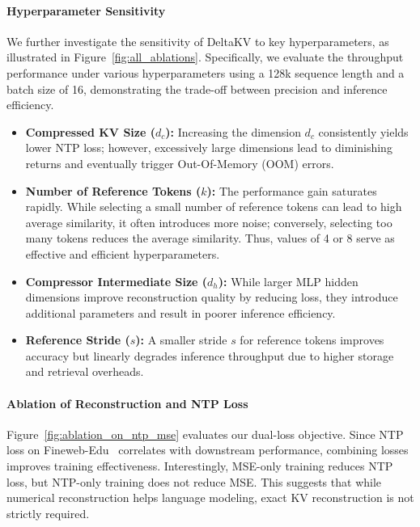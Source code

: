 \paragraph{Hyperparameter Sensitivity}
We further investigate the sensitivity of DeltaKV to key hyperparameters, as illustrated in Figure~\ref{fig:all_ablations}. 
Specifically, we evaluate the throughput performance under various hyperparameters using a 128k sequence length and a batch size of 16, demonstrating the trade-off between precision and inference efficiency.
\vspace{-0.5em}
\begin{itemize}[nolistsep, left=0pt]
  \item \textbf{Compressed KV Size ($d_c$):} Increasing the dimension $d_c$ consistently yields lower NTP loss; however, excessively large dimensions lead to diminishing returns and eventually trigger Out-Of-Memory (OOM) errors. 
  
  \item \textbf{Number of Reference Tokens ($k$):} The performance gain saturates rapidly. While selecting a small number of reference tokens can lead to high average similarity, it often introduces more noise; conversely, selecting too many tokens reduces the average similarity. Thus, values of 4 or 8 serve as effective and efficient hyperparameters.

  \item \textbf{Compressor Intermediate Size ($d_h$):} While larger MLP hidden dimensions improve reconstruction quality by reducing loss, they introduce additional parameters and result in poorer inference efficiency.  

  \item \textbf{Reference Stride ($s$):} A smaller stride $s$ for reference tokens improves accuracy but linearly degrades inference throughput due to higher storage and retrieval overheads.
\end{itemize}

\vspace{-0.5em}
\paragraph{Ablation of Reconstruction and NTP Loss}
Figure~\ref{fig:ablation_on_ntp_mse} evaluates our dual-loss objective.
Since NTP loss on Fineweb-Edu~\cite{penedo2024fineweb} correlates with downstream performance, combining losses improves training effectiveness. 
Interestingly, MSE-only training reduces NTP loss, but NTP-only training does not reduce MSE. This suggests that while numerical reconstruction helps language modeling, exact KV reconstruction is not strictly required.